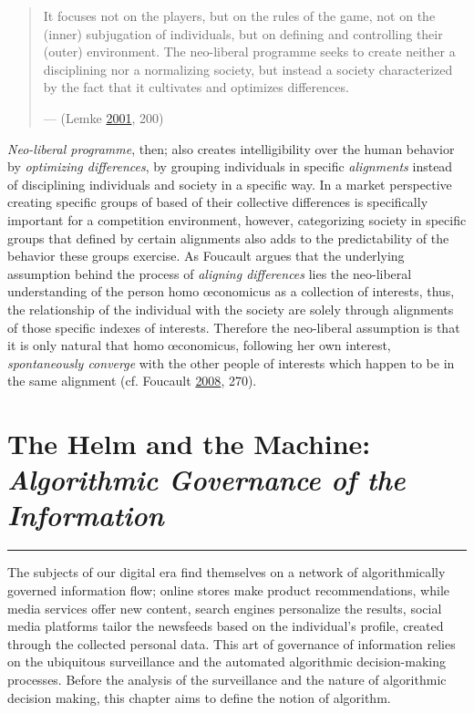 \documentclass[12pt,twoside]{report}
\begin{document}
\begin{quote}
It focuses not on the players, but on the rules of the game, not on the (inner) subjugation of individuals, but on defining and controlling their (outer) environment. The neo-liberal programme seeks to create neither a disciplining nor a normalizing society, but instead a society characterized by the fact that it cultivates and optimizes differences.

--- (Lemke \protect\hyperlink{ref-Lemke2001}{2001}, 200)
\end{quote}

\emph{Neo-liberal programme}, then; also creates intelligibility over the human behavior by \emph{optimizing differences}, by grouping individuals in specific \emph{alignments} instead of disciplining individuals and society in a specific way. In a market perspective creating specific groups of based of their collective differences is specifically important for a competition environment, however, categorizing society in specific groups that defined by certain alignments also adds to the predictability of the behavior these groups exercise. As Foucault argues that the underlying assumption behind the process of \emph{aligning differences} lies the neo-liberal understanding of the person homo œconomicus as a collection of interests, thus, the relationship of the individual with the society are solely through alignments of those specific indexes of interests. Therefore the neo-liberal assumption is that it is only natural that homo œconomicus, following her own interest, \emph{spontaneously converge} with the other people of interests which happen to be in the same alignment (cf. Foucault \protect\hyperlink{ref-Foucault2008}{2008}, 270).

\hypertarget{alg}{%
\chapter{\texorpdfstring{The Helm and the Machine: \emph{Algorithmic Governance of the Information}}{The Helm and the Machine: Algorithmic Governance of the Information}}\label{alg}}

\begin{center}\rule{0.5\linewidth}{\linethickness}\end{center}

The subjects of our digital era find themselves on a network of algorithmically governed information flow; online stores make product recommendations, while media services offer new content, search engines personalize the results, social media platforms tailor the newsfeeds based on the individual's profile, created through the collected personal data. This art of governance of information relies on the ubiquitous surveillance and the automated algorithmic decision-making processes. Before the analysis of the surveillance and the nature of algorithmic decision making, this chapter aims to define the notion of algorithm.
\end{document}
